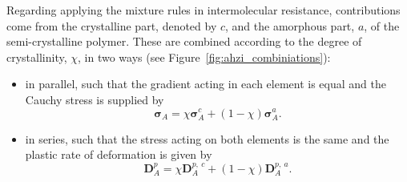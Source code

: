 Regarding applying the mixture rules in intermolecular resistance, contributions come from the crystalline part, denoted by $c$, and the amorphous part, $a$, of the semi-crystalline polymer.
These are combined according to the degree of crystallinity, $\chi$, in two ways (see Figure~\ref{fig:ahzi_combiniations}):
\begin{itemize}
	\item in parallel, such that the gradient acting in each element is equal and the Cauchy stress is supplied by
	\begin{equation}
		\bm\sigma_A = \chi\bm\sigma_A^c + (1 -\chi)\bm\sigma_A^a.
	\end{equation}
	\item in series, such that the stress acting on both elements is the same and the plastic rate of deformation is given by
	\begin{equation}
		\mathbf D^p_A = \chi \mathbf D^{p,\ c}_A + (1 -\chi)\mathbf D^{p,\ a}_A.
	\end{equation}
\end{itemize}
